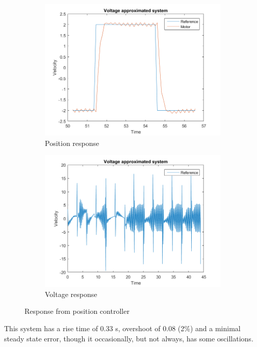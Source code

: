 \documentclass[12pt,a4paper]{article}
\begin{document}
\begin{figure}[H]
  \centering
  \begin{subfigure}[b]{0.45\linewidth}
    \includegraphics[width=\linewidth]{Pos_l1.png}
    \caption{Position response}
    \label{fig:pos_l1:a}
  \end{subfigure}
  \begin{subfigure}[b]{0.45\linewidth}
    \includegraphics[width=\linewidth]{Pos_l1_V.png}
    \caption{Voltage response}
    \label{fig:pos_l1V:b}
  \end{subfigure}
  \caption{Response from position controller}
  \label{fig:pos_cont}
\end{figure}
This system has a rise time of 0.33 s, overshoot of 0.08 (2\%) and a minimal
steady state error, though it occasionally, but not always, has some 
oscillations.
\end{document}

